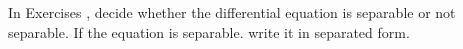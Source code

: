 {\noindent In Exercises}
{, decide whether the differential equation is separable or not separable.  If the equation is separable. write it in separated form.}
